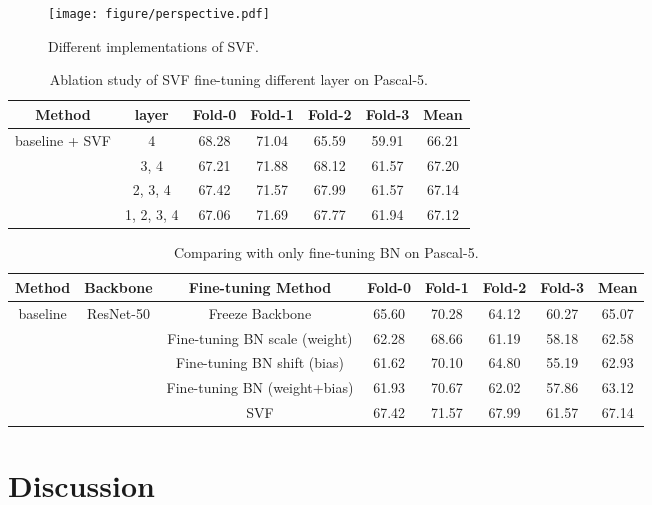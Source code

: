 \documentclass{article}
\begin{document}
\begin{figure*}[h]
\vspace{-0.9em}
	\centering
	\setlength{\abovecaptionskip}{0.cm}
	\texttt{[image: figure/perspective.pdf]}
	\caption{Different implementations of SVF.}
	\label{fig:perspective}
\end{figure*}

\begin{table}[]\scriptsize
\centering
\renewcommand\arraystretch{1.1}
\caption{Ablation study of SVF fine-tuning different layer on Pascal-5.}
\label{tab:app_svf_layer}
\begin{tabular}{c|c|cccc|c}
\hline
Method & layer & Fold-0 & Fold-1 & Fold-2 & Fold-3 & Mean  \\ \hline
\multirow{4}{*}{baseline + SVF} & 4 & 68.28 & 71.04 & 65.59 & 59.91 & 66.21 \\
                & 3, 4 & 67.21  & 71.88  & 68.12  & 61.57  & 67.20 \\
                & 2, 3, 4 & 67.42  & 71.57  & 67.99  & 61.57  & 67.14 \\  
                & 1, 2, 3, 4  & 67.06  & 71.69  & 67.77  & 61.94  & 67.12 \\ \hline 
\end{tabular}
\end{table}

\begin{table}[]\scriptsize
\centering
\renewcommand\arraystretch{1.1}
\caption{Comparing with only fine-tuning BN on Pascal-5.}
\label{tab:com_bn}
\begin{tabular}{c|c|c|cccc|c}
\hline
Method & Backbone& Fine-tuning Method & Fold-0 & Fold-1 & Fold-2 & Fold-3 & Mean  \\ \hline
\multirow{5}{*}{baseline} & \multirow{5}{*}{ResNet-50}  &Freeze Backbone& 65.60 & 70.28 & 64.12 & 60.27 & 65.07 \\
 & & Fine-tuning BN scale (weight) & 62.28  & 68.66  & 61.19  & 58.18  & 62.58 \\
 &               & Fine-tuning BN shift (bias)&	61.62&	70.10&	64.80&	55.19&	62.93 \\  
  &              & Fine-tuning BN (weight+bias)	&61.93	&70.67&	62.02&	57.86&	63.12 \\ 
  && SVF&	67.42&	71.57&	67.99&	61.57&	67.14\\
  \hline 
\end{tabular}
\end{table}

\section{Discussion}
\end{document}
